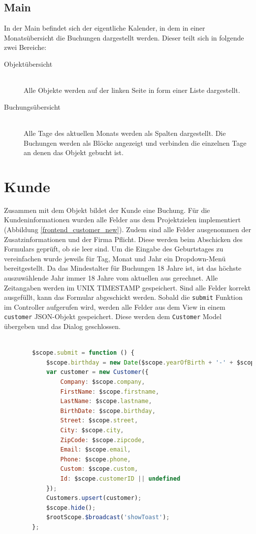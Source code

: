 \subsection{Main}
In der Main befindet sich der eigentliche Kalender, in dem in einer Monatsübersicht die Buchungen dargestellt werden. 
Dieser teilt sich in folgende zwei Bereiche:
\begin{description}
\item[Objektübersicht]\hfill \\
Alle Objekte werden auf der linken Seite in form einer Liste dargestellt.
\item[Buchungsübersicht]\hfill \\ 
Alle Tage des aktuellen Monats werden als Spalten dargestellt. Die Buchungen werden als Blöcke angezeigt und verbinden die einzelnen Tage an denen das Objekt gebucht ist.  
\end{description}

\section{Kunde}
Zusammen mit dem Objekt bildet der Kunde eine Buchung. Für die Kundeninformationen wurden alle Felder aus dem Projektzielen implementiert (Abbildung \ref{frontend_customer_new}). Zudem sind alle Felder ausgenommen der Zusatzinformationen und der Firma Pflicht. Diese werden beim Abschicken des Formulars geprüft, ob sie leer sind. Um die Eingabe des Geburtstages zu vereinfachen wurde jeweils für Tag, Monat und Jahr ein Dropdown-Menü bereitgestellt. Da das Mindestalter für Buchungen 18 Jahre ist, ist das höchste auszuwählende Jahr immer 18 Jahre vom aktuellen aus gerechnet. Alle Zeitangaben werden im UNIX TIMESTAMP gespeichert. Sind alle Felder korrekt ausgefüllt, kann das Formular abgeschickt werden. Sobald die \texttt{submit} Funktion im Controller aufgerufen wird, werden alle Felder aus dem View in einem \texttt{customer} JSON-Objekt gespeichert. Diese werden dem \texttt{Customer} Model übergeben und das Dialog geschlossen. 

\begin{lstlisting}[language=JavaScript, label=code_exampleRegistrationRequest, caption=Beispielhafte Antwort auf eine Registrierungsanfrage]

		$scope.submit = function () {
            $scope.birthday = new Date($scope.yearOfBirth + '-' + $scope.monthOfBirth + '-' + $scope.dayOfBirth).getTime();
            var customer = new Customer({
                Company: $scope.company,
                FirstName: $scope.firstname,
                LastName: $scope.lastname,
                BirthDate: $scope.birthday,
                Street: $scope.street,
                City: $scope.city,
                ZipCode: $scope.zipcode,
                Email: $scope.email,
                Phone: $scope.phone,
                Custom: $scope.custom,
                Id: $scope.customerID || undefined
            });
            Customers.upsert(customer);
            $scope.hide();
            $rootScope.$broadcast('showToast');
        };
\end{lstlisting}

